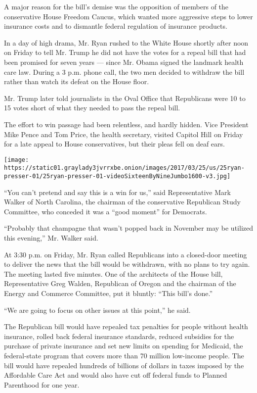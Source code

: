 A major reason for the bill's demise was the opposition of members of
the conservative House Freedom Caucus, which wanted more aggressive
steps to lower insurance costs and to dismantle federal regulation of
insurance products.

In a day of high drama, Mr. Ryan rushed to the White House shortly after
noon on Friday to tell Mr. Trump he did not have the votes for a repeal
bill that had been promised for seven years --- since Mr. Obama signed
the landmark health care law. During a 3 p.m. phone call, the two men
decided to withdraw the bill rather than watch its defeat on the House
floor.

Mr. Trump later told journalists in the Oval Office that Republicans
were 10 to 15 votes short of what they needed to pass the repeal bill.

The effort to win passage had been relentless, and hardly hidden. Vice
President Mike Pence and Tom Price, the health secretary, visited
Capitol Hill on Friday for a late appeal to House conservatives, but
their pleas fell on deaf ears.

\texttt{[image: https://static01.graylady3jvrrxbe.onion/images/2017/03/25/us/25ryan-presser-01/25ryan-presser-01-videoSixteenByNineJumbo1600-v3.jpg]}

``You can't pretend and say this is a win for us,'' said Representative
Mark Walker of North Carolina, the chairman of the conservative
Republican Study Committee, who conceded it was a ``good moment'' for
Democrats.

``Probably that champagne that wasn't popped back in November may be
utilized this evening,'' Mr. Walker said.

At 3:30 p.m. on Friday, Mr. Ryan called Republicans into a closed-door
meeting to deliver the news that the bill would be withdrawn, with no
plans to try again. The meeting lasted five minutes. One of the
architects of the House bill, Representative Greg Walden, Republican of
Oregon and the chairman of the Energy and Commerce Committee, put it
bluntly: ``This bill's done.''

``We are going to focus on other issues at this point,'' he said.

The Republican bill would have repealed tax penalties for people without
health insurance, rolled back federal insurance standards, reduced
subsidies for the purchase of private insurance and set new limits on
spending for Medicaid, the federal-state program that covers more than
70 million low-income people. The bill would have repealed hundreds of
billions of dollars in taxes imposed by the Affordable Care Act and
would also have cut off federal funds to Planned Parenthood for one
year.

